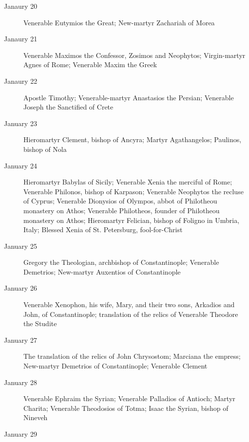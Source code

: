 \begin{description}
\item[Janaury 20]

Venerable Eutymios the Great; New-martyr Zachariah of Morea

\item[Janaury 21]

Venerable Maximos the Confessor, Zosimos and Neophytos; Virgin-martyr Agnes of Rome; Venerable Maxim the Greek

\item[Janaury 22]

Apostle Timothy; Venerable-martyr Anastasios the Persian; Venerable Joseph the Sanctified of Crete

\item[January 23]

Hieromartyr Clement, bishop of Ancyra; Martyr Agathangelos; Paulinos, bishop of Nola

\item[January 24]

Hieromartyr Babylas of Sicily; Venerable Xenia the merciful of Rome; Venerable Philonos, bishop of Karpason; Venerable Neophytos the recluse of Cyprus; Venerable Dionysios of Olympos, abbot of Philotheou monastery on Athos; Venerable Philotheos, founder of Philotheou monastery on Athos; Hieromartyr Felician, bishop of Foligno in Umbria, Italy; Blessed Xenia of St. Petersburg, fool-for-Christ

\item[January 25]

Gregory the Theologian, archbishop of Constantinople; Venerable Demetrios; New-martyr Auxentios of Constantinople

\item[January 26]

Venerable Xenophon, his wife, Mary, and their two sons, Arkadios and John, of Constantinople; translation of the relics of Venerable Theodore the Studite

\item[January 27]

The translation of the relics of John Chrysostom; Marciana the empress; New-martyr Demetrios of Constantinople; Venerable Clement

\item[January 28]

Venerable Ephraim the Syrian; Venerable Palladios of Antioch; Martyr Charita; Venerable Theodosios of Totma; Isaac the Syrian, bishop of Nineveh

\item[January 29]


\end{description}
